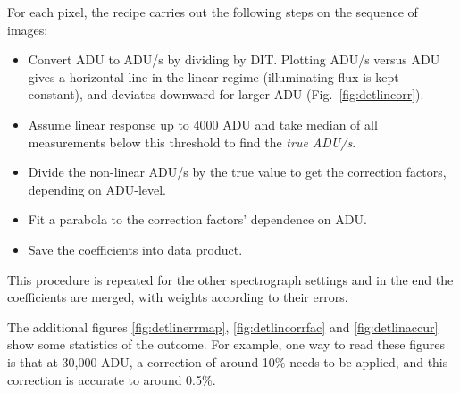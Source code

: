 For each pixel, the recipe carries out the following steps on the sequence of images:
\begin{itemize}
    \item Convert ADU to ADU/s by dividing by DIT. Plotting ADU/s versus ADU
    gives a horizontal line in the linear regime (illuminating flux is kept
    constant), and deviates downward for larger ADU (Fig.~\ref{fig:detlincorr}).
    \item Assume linear response up to 4000 ADU and take median of all
    measurements below this threshold to find the \emph{true ADU/s}.
    \item Divide the non-linear ADU/s by the true value to get the correction
    factors, depending on ADU-level.
    \item Fit a parabola to the correction factors' dependence on ADU.
    \item Save the coefficients into data product.
\end{itemize}

This procedure is repeated for the other spectrograph settings and in the end
the coefficients are merged, with weights according to their errors.







The additional figures \ref{fig:detlinerrmap}, \ref{fig:detlincorrfac} and \ref{fig:detlinaccur} show some statistics of the outcome.
For example, one way to read these figures is that at 30,000 ADU, a correction
of around 10\% needs to be applied, and this correction is accurate to around
0.5\%. 

